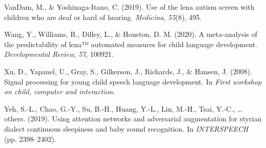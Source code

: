 \documentclass[english,,man]{apa6}
\begin{document}
\leavevmode\hypertarget{ref-vandam2019use}{}%
VanDam, M., \& Yoshinaga-Itano, C. (2019). Use of the lena autism screen with children who are deaf or hard of hearing. \emph{Medicina}, \emph{55}(8), 495.

\leavevmode\hypertarget{ref-wang2020meta}{}%
Wang, Y., Williams, R., Dilley, L., \& Houston, D. M. (2020). A meta-analysis of the predictability of lena™ automated measures for child language development. \emph{Developmental Review}, \emph{57}, 100921.

\leavevmode\hypertarget{ref-xu2008signal}{}%
Xu, D., Yapanel, U., Gray, S., Gilkerson, J., Richards, J., \& Hansen, J. (2008). Signal processing for young child speech language development. In \emph{First workshop on child, computer and interaction}.

\leavevmode\hypertarget{ref-yeh2019using}{}%
Yeh, S.-L., Chao, G.-Y., Su, B.-H., Huang, Y.-L., Lin, M.-H., Tsai, Y.-C., \ldots{} others. (2019). Using attention networks and adversarial augmentation for styrian dialect continuous sleepiness and baby sound recognition. In \emph{INTERSPEECH} (pp. 2398--2402).
\end{document}
